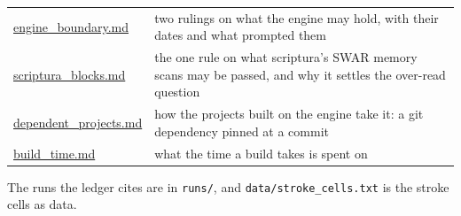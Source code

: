 {\begin{longtable}{>{\RaggedRight\arraybackslash}p{}>{\RaggedRight\arraybackslash}p{}}
\hyperref[chap:engine-boundary]{engine\_\allowbreak{}boundary.md} & two rulings on what the engine may hold, with their dates and what prompted them \\
\hyperref[chap:scriptura-blocks]{scriptura\_\allowbreak{}blocks.md} & the one rule on what scriptura's SWAR memory scans may be passed, and why it settles the over-read question \\
\hyperref[chap:dependent-projects]{dependent\_\allowbreak{}projects.md} & how the projects built on the engine take it: a git dependency pinned at a commit \\
\hyperref[chap:build-time]{build\_\allowbreak{}time.md} & what the time a build takes is spent on \\
\bottomrule
\end{longtable}
}

The runs the ledger cites are in \texttt{runs/\allowbreak{}}, and \texttt{data/\allowbreak{}stroke\_\allowbreak{}cells.\allowbreak{}txt} is the stroke cells as data.
